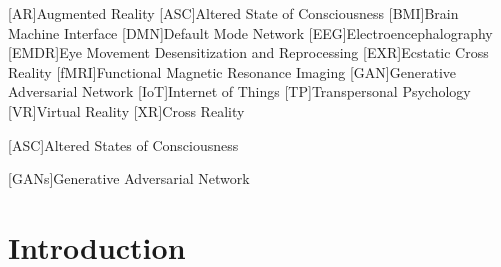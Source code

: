 \documentclass{UIdahoMastersThesis}
\begin{document}
\begin{acronym}[EMDR]  %
	[{\textup{AR}}]{Augmented Reality}
	[{\textup{ASC}}]{Altered State of Consciousness}
	[{\textup{BMI}}]{Brain Machine Interface}	
	[{\textup{DMN}}]{Default Mode Network}	
	[{\textup{EEG}}]{Electroencephalography}
	[{\textup{EMDR}}]{Eye Movement Desensitization and Reprocessing}
	[{\textup{EXR}}]{Ecstatic Cross Reality}	
	[{\textup{fMRI}}]{Functional Magnetic Resonance Imaging}
	[{\textup{GAN}}]{Generative Adversarial Network}	
	[{\textup{IoT}}]{Internet of Things}			
	[{\textup{TP}}]{Transpersonal Psychology}
	[{\textup{VR}}]{Virtual Reality}
	[{\textup{XR}}]{Cross Reality}
	


	[{\textup{ASC}}]{Altered States of Consciousness}







	[GANs]{Generative Adversarial Network}  %
	
\end{acronym}



\mainmatter  %
\setcounter{secnumdepth}{1}  %




\clearpage
\chapter{Introduction}
\label{Chapter:Introduction}
\end{document}
